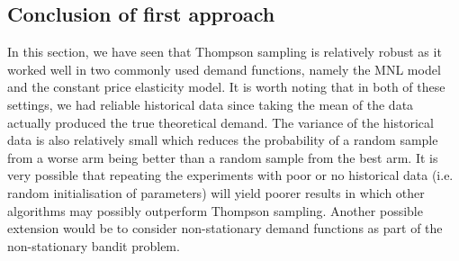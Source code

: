 \documentclass[a4paper]{article}
\begin{document}
\subsection{Conclusion of first approach}
In this section, we have seen that Thompson sampling is relatively robust as it worked well in two commonly used demand functions, namely the MNL model and the constant price elasticity model. It is worth noting that in both of these settings, we had reliable historical data since taking the mean of the data actually produced the true theoretical demand. The variance of the historical data is also relatively small which reduces the probability of a random sample from a worse arm being better than a random sample from the best arm. It is very possible that repeating the experiments with poor or no historical data (i.e. random initialisation of parameters) will yield poorer results in which other algorithms may possibly outperform Thompson sampling. Another possible extension would be to consider non-stationary demand functions as part of the non-stationary bandit problem.
\end{document}
